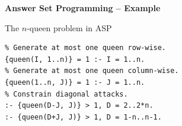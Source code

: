 \documentclass[aspectratio=169]{beamer}
\begin{document}

\begin{frame}[fragile]{\textbf{Answer Set Programming -- Example}}
\begin{center}
  \begin{minipage}{5cm}
    \resizebox{\textwidth}{!}{
      \chessboard[style=nqueens]{}
    }
  \end{minipage}
  \begin{minipage}{7cm}
    The $n$-queen problem in ASP
    \begin{verbatim}
% Generate at most one queen row-wise.
{queen(I, 1..n)} = 1 :- I = 1..n.
% Generate at most one queen column-wise.
{queen(1..n, J)} = 1 :- J = 1..n.
% Constrain diagonal attacks.
:- {queen(D-J, J)} > 1, D = 2..2*n.
:- {queen(D+J, J)} > 1, D = 1-n..n-1.
    \end{verbatim}
  \end{minipage}
\end{center}
\end{frame}

\end{document}
